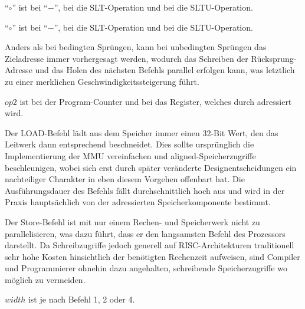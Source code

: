 {``\(\circ\)'' ist bei  ``\(-\)'', bei  die SLT-Operation
und bei  die SLTU-Operation.
}

{``\(\circ\)'' ist bei  ``\(-\)'', bei  die SLT-Operation
und bei  die SLTU-Operation.
}

Anders als bei bedingten Spr\"ungen, kann bei unbedingten Spr\"ungen das
Zieladresse immer vorhergesagt werden, wodurch das Schreiben der R\"ucksprung-Adresse
und das Holen des n\"achsten Befehls parallel erfolgen kann, was letztlich zu einer
merklichen Geschwindigkeitssteigerung f\"uhrt.

{\(op2\) ist bei  der Program-Counter und bei  das
Register, welches durch  adressiert wird.
}

Der LOAD-Befehl l\"adt aus dem Speicher immer einen 32-Bit Wert, den das
Leitwerk dann entsprechend beschneidet. Dies sollte urspr\"unglich die Implementierung der
MMU vereinfachen und aligned-Speicherzugriffe beschleunigen, wobei sich erst durch sp\"ater ver\"anderte Designentscheidungen ein nachteiliger Charakter in eben diesem Vorgehen offenbart hat. Die Ausf\"uhrungsdauer des Befehls f\"allt durchschnittlich hoch aus und wird in der
Praxis haupts\"achlich von der adressierten Speicherkomponente bestimmt.


Der Store-Befehl ist mit nur einem Rechen- und Speicherwerk nicht zu
parallelisieren, was dazu f\"uhrt, dass er den langsamsten Befehl des Prozessors
darstellt. Da Schreibzugriffe jedoch generell auf RISC-Architekturen traditionell sehr hohe Kosten hinsichtlich der ben\"otigten Rechenzeit aufweisen, sind Compiler und Programmierer ohnehin dazu angehalten, schreibende Speicherzugriffe wo m\"oglich zu vermeiden.

{\(width\) ist je nach Befehl 1, 2 oder 4.
}

